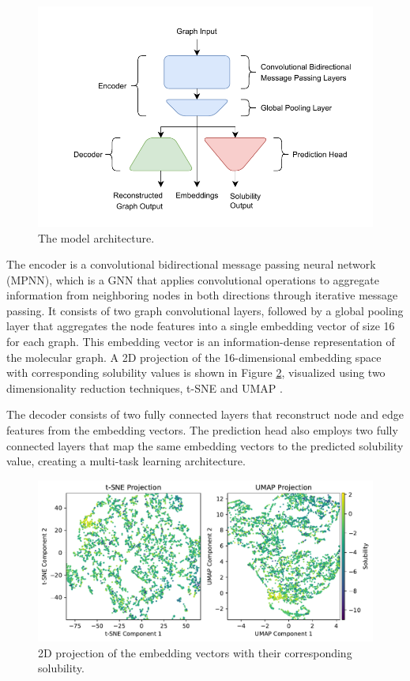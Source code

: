 \documentclass[11pt,a4paper]{article}
\begin{document}
\begin{figure}[htbp]
        \centering
        \includegraphics[width=1\textwidth]{model.pdf}
        \caption{The model architecture.}
        \label{fig:model}
\end{figure}

The encoder is a convolutional bidirectional message passing neural network (MPNN), which is a GNN that applies convolutional operations to aggregate information from neighboring nodes in both directions through iterative message passing. It consists of two graph convolutional layers, followed by a global pooling layer that aggregates the node features into a single embedding vector of size 16 for each graph. This embedding vector is an information-dense representation of the molecular graph. A 2D projection of the 16-dimensional embedding space with corresponding solubility values is shown in Figure \ref{fig:solubility}, visualized using two dimensionality reduction techniques, t-SNE \cite{van2008visualizing} and UMAP \cite{mcinnes2018umap}.

The decoder consists of two fully connected layers that reconstruct node and edge features from the embedding vectors. The prediction head also employs two fully connected layers that map the same embedding vectors to the predicted solubility value, creating a multi-task learning architecture.

\begin{figure}[htbp]
        \centering
        \includegraphics[width=1\textwidth]{solubility.pdf}
        \caption{2D projection of the embedding vectors with their corresponding solubility.}
        \label{fig:solubility}
\end{figure}
\end{document}
